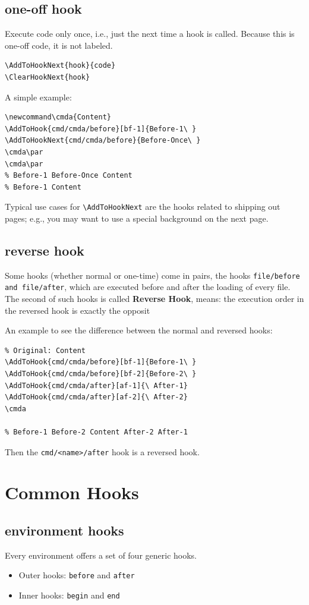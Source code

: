 \documentclass{article}
\newcommand\tbh{\textbackslash}
\newcommand\cmda{Content}
\begin{document}
\subsection{one-off hook}
Execute code only once, i.e., just the next time a hook is called. Because this is one-off code, it is
not labeled.
\begin{lstlisting}
\AddToHookNext{hook}{code}
\ClearHookNext{hook}
\end{lstlisting}

A simple example:
\begin{lstlisting}
\newcommand\cmda{Content}
\AddToHook{cmd/cmda/before}[bf-1]{Before-1\ }
\AddToHookNext{cmd/cmda/before}{Before-Once\ }
\cmda\par
\cmda\par
% Before-1 Before-Once Content
% Before-1 Content
\end{lstlisting}

Typical use cases for \texttt{\tbh AddToHookNext} are the hooks related
to shipping out pages; e.g., you may want to use a special background on the next
page.

\subsection{reverse hook}
Some hooks (whether normal or one-time) come in pairs, the hooks
\texttt{file/before and file/after}, which are executed before and after the loading of
every file. The second of such hooks is called \textbf{Reverse Hook}, means: the execution
order in the reversed hook is exactly the opposit

An example to see the difference between the normal and reversed hooks:
\begin{lstlisting}
% Original: Content
\AddToHook{cmd/cmda/before}[bf-1]{Before-1\ }
\AddToHook{cmd/cmda/before}[bf-2]{Before-2\ }
\AddToHook{cmd/cmda/after}[af-1]{\ After-1}
\AddToHook{cmd/cmda/after}[af-2]{\ After-2}
\cmda

% Before-1 Before-2 Content After-2 After-1
\end{lstlisting}

Then the \texttt{cmd/<name>/after} hook is a reversed hook.

\section{Common Hooks}
\subsection{environment hooks}
Every environment offers a set of four generic hooks. 
\begin{itemize}
  \item Outer hooks: \texttt{before} and \texttt{after}
  \item Inner hooks: \texttt{begin} and \texttt{end}
\end{itemize}
\end{document}
